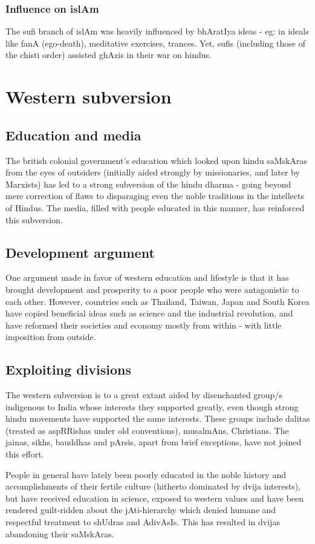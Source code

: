 \documentclass[oneside, article]{memoir}
\begin{document}
\subsubsection{Influence on islAm}
The sufi branch of islAm was heavily influenced by bhAratIya ideas - eg: in ideals like fanA (ego-death), meditative exercises, trances. Yet, sufis (including those of the chisti order) assisted ghAzis in their war on hindus.

\section{Western subversion}
\subsection{Education and media}
The british colonial government's education which looked upon hindu saMskAras from the eyes of outsiders (initially aided strongly by missionaries, and later by Marxists) has led to a strong subversion of the hindu dharma - going beyond mere correction of flaws to disparaging even the noble traditions in the intellects of Hindus. The media, filled with people educated in this manner, has reinforced this subversion.

\subsection{Development argument}
One argument made in favor of western education and lifestyle is that it has brought development and prosperity to a poor people who were antagonistic to each other. However, countries such as Thailand, Taiwan, Japan and South Korea have copied beneficial ideas such as science and the industrial revolution, and have reformed their societies and economy mostly from within - with little imposition from outside.

\subsection{Exploiting divisions}
The western subversion is to a great extant aided by disenchanted group/s indigenous to India whose interests they supported greatly, even though strong hindu movements have supported the same interests. These groups include dalitas (treated as aspRRishas under old conventions), musalmAns, Christians. The jainas, sikhs, bauddhas and pArsis, apart from brief exceptions, have not joined this effort.

People in general have lately been poorly educated in the noble history and accomplishments of their fertile culture (hitherto dominated by dvija interests), but have received education in science, exposed to western values and have been rendered guilt-ridden about the jAti-hierarchy which denied humane and respectful treatment to shUdras and AdivAsIs. This has resulted in dvijas abandoning their saMskAras.
\end{document}
